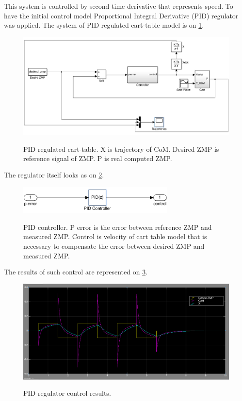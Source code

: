 \documentclass[12pt,a4paper]{report}
\begin{document}
		This system is controlled by second time derivative that represents speed. To have the initial control model Proportional Integral Derivative (PID) regulator was applied. The system of PID regulated cart-table model is on \cref{fig:15}.
		
		\begin{figure}[H]
			\vspace{-0.2cm}
			\centering
			{\includegraphics[width=1\textwidth]{15}}
			\caption{PID regulated cart-table. X is trajectory of CoM. Desired ZMP is reference signal of ZMP. P is real computed ZMP.}
			\label{fig:15}
			\vspace{-0.1cm}
		\end{figure}
		
		The regulator itself looks as on \cref{fig:16}.
		
		\begin{figure}[H]
			\vspace{-0.2cm}
			\centering
			{\includegraphics[width=0.7\textwidth]{16}}
			\caption{PID controller. P error is the error between reference ZMP and measured ZMP. Control is velocity of cart table model that is necessary to compensate the error between desired ZMP and measured ZMP.}
			\label{fig:16}
			\vspace{-0.1cm}
		\end{figure}
		
		The results of such control are represented on \cref{fig:17}.
		
		\begin{figure}[H]
			\vspace{-0.2cm}
			\centering
			{\includegraphics[width=1\textwidth]{17}}
			\caption{PID regulator control results.}
			\label{fig:17}
			\vspace{-0.1cm}
		\end{figure}
		
\end{document}
